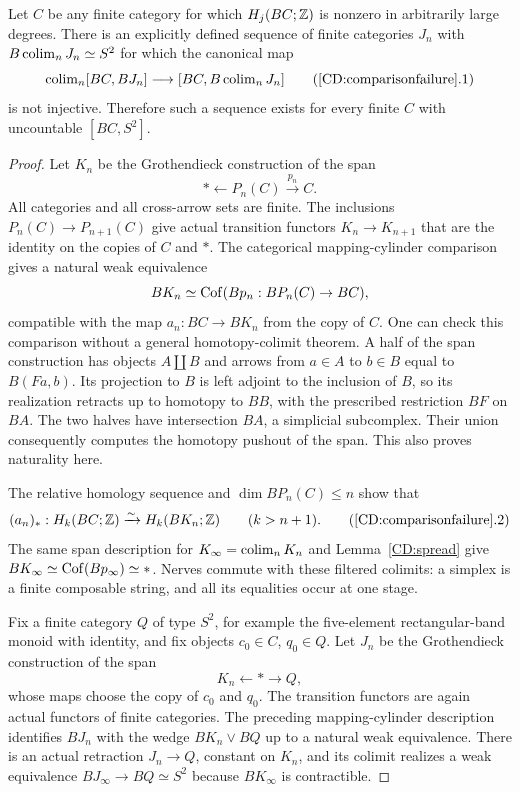 \begin{theorem}
\label{CD:comparisonfailure}
Let $C$ be any finite category for which $H_j(BC;\mathbb Z)$ is nonzero
in arbitrarily large degrees.  There is an explicitly defined sequence
of finite categories $J_n$ with
$B\operatorname{colim}_nJ_n\simeq S^2$ for which the canonical map
\[
 \colim_n[BC,BJ_n]\longrightarrow[BC,B\colim_nJ_n]
 \tag{\ref{CD:comparisonfailure}.1}
\]
is not injective.  Therefore such a sequence exists for every finite
$C$ with uncountable $[BC,S^2]$.
\end{theorem}
\begin{proof}
Let $K_n$ be the Grothendieck construction of the span
\[
                         *\longleftarrow P_n(C)\xrightarrow{p_n}C.
\]
All categories and all cross-arrow sets are finite.  The inclusions
$P_n(C)\to P_{n+1}(C)$ give actual transition functors $K_n\to K_{n+1}$
that are the identity on the copies of $C$ and $*$.
The categorical mapping-cylinder comparison gives a natural weak
equivalence
\[
                   BK_n\simeq\operatorname{Cof}(Bp_n:BP_n(C)\to BC),
\]
compatible with the map $a_n:BC\to BK_n$ from the copy of $C$.
One can check this comparison without a general homotopy-colimit
theorem.  A half of the span construction has objects $A\amalg B$
and arrows from $a\in A$ to $b\in B$ equal to $B(Fa,b)$.
Its projection to $B$ is left adjoint to the inclusion of $B$, so
its realization retracts up to homotopy to $BB$, with the prescribed
restriction $BF$ on $BA$.  The two halves have intersection $BA$,
a simplicial subcomplex.  Their union consequently computes the
homotopy pushout of the span.  This also proves naturality here.

The relative homology sequence and $\dim BP_n(C)\le n$ show that
\[
 (a_n)_*:H_k(BC;\Z)\xrightarrow{\sim}H_k(BK_n;\Z)
                         \qquad(k>n+1).
 \tag{\ref{CD:comparisonfailure}.2}
\]
The same span description for $K_\infty=\operatorname{colim}_nK_n$ and
Lemma~\ref{CD:spread} give
$BK_\infty\simeq\operatorname{Cof}(Bp_\infty)\simeq *$.
Nerves commute with these filtered colimits: a simplex is a finite
composable string, and all its equalities occur at one stage.

Fix a finite category $Q$ of type $S^2$, for example the five-element
rectangular-band monoid with identity, and fix objects $c_0\in C$,
$q_0\in Q$.  Let $J_n$ be the Grothendieck construction of the span
\[
                 K_n\longleftarrow *\longrightarrow Q,
\]
whose maps choose the copy of $c_0$ and $q_0$.
The transition functors are again actual functors of finite categories.
The preceding mapping-cylinder description identifies
$BJ_n$ with the wedge $BK_n\vee BQ$ up to a natural weak equivalence.
There is an actual retraction $J_n\to Q$, constant on $K_n$, and its
colimit realizes a weak equivalence
$BJ_\infty\to BQ\simeq S^2$ because $BK_\infty$ is contractible.


\end{proof}
